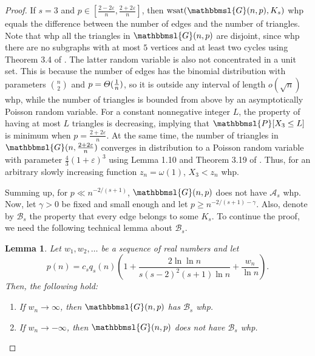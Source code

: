 \documentclass[hidelinks, 11pt]{article}
\theoremstyle{plain}
\newtheorem{lemma}[theorem]{Lemma}
\theoremstyle{definition}
\begin{document}
\begin{proof}
If $s=3$ and $p\in[\tfrac{2-2\varepsilon}{n}, \tfrac{2+2\varepsilon}{n}]$,  then $\mathrm{wsat}(\mathbbmsl{G}(n, p), K_s)$ whp       equals the difference between the number of edges and the number of triangles. Note that whp all the triangles in $\mathbbmsl{G}(n, p)$ are disjoint,  since whp there are no subgraphs with at most $5$ vertices and at least two cycles  using   Theorem 3.4 of   \cite{RG}. The latter random variable is also not concentrated in a unit set. This is because the number of edges has the binomial distribution with parameters ${n\choose 2}$ and $p=\mathnormal{\Theta}(\tfrac{1}{n})$,  so
it is outside any interval of length  $o(\sqrt{n})$ whp,  while the number of triangles is bounded from above by an asymptotically Poisson random variable.  For a constant nonnegative  integer  $L$, the property of having at most $L$ triangles is   decreasing,  implying that $\mathbbmsl{P}[X_3\leq L]$ is minimum when $p=\tfrac{2+2\varepsilon}{n}$. At the same time,  the number of  triangles in $\mathbbmsl{G}(n, \tfrac{2+2\varepsilon}{n})$ converges in distribution to
a Poisson random variable with parameter $\tfrac{4}{3}(1+\varepsilon)^3$
using    Lemma 1.10 and Theorem 3.19 of \cite{RG}. Thus,   for an arbitrary slowly increasing function $z_n=\omega(1)$,   $X_3<z_n$ whp.


Summing up, for $p\ll n^{-2/(s+1)}$,   $\mathbbmsl{G}(n,p)$ does not have $\mathcal{A}_s$ whp.
Now, let $\gamma>0$ be fixed and small enough  and  let $p\geq n^{-2/(s+1)-\gamma}$. Also, denote  by $\mathcal{B}_s$ the property  that every edge belongs to some $K_s$. To continue  the proof, we need the following technical lemma about $\mathcal{B}_s$.



\begin{lemma}\label{edge_in_clique}
Let $w_1, w_2, \ldots$ be a sequence of real numbers  and let
$$p(n)=c_sq_s(n)\left(1+\frac{2\ln\ln n}{s(s-2)^2(s+1)\ln n}+\frac{w_n}{\ln n}\right).$$
Then, the  following hold:
\begin{enumerate}
\item[{\rm (i)}] If $w_n\to\infty$, then   $\mathbbmsl{G}(n,p)$ has $\mathcal{B}_s$ whp.
\item[{\rm (ii)}] If $w_n\to-\infty$, then   $\mathbbmsl{G}(n,p)$ does not have $\mathcal{B}_s$ whp.
\end{enumerate}
\end{lemma}




\end{proof}
\end{document}
